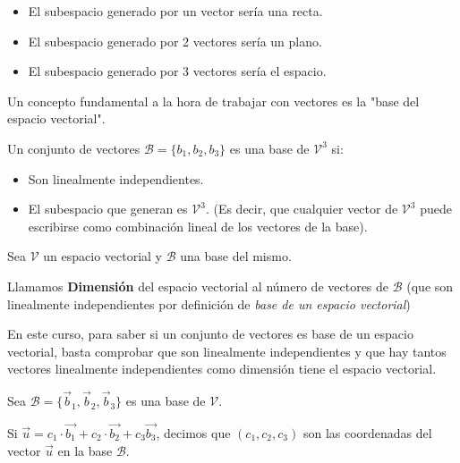 \begin{example}
\begin{itemize}
  \item El subespacio generado por un vector sería una recta.
  \item El subespacio generado por 2 vectores sería un plano.
  \item El subespacio generado por 3 vectores sería el espacio.
\end{itemize}
\end{example}

Un concepto fundamental a la hora de trabajar con vectores es la "base del espacio vectorial". 

\begin{defn}
Un conjunto de vectores $\mathcal{B} = \{b_1,b_2,b_3\}$ es una base de $\mathcal{V}^3$ si:
  \begin{itemize}
      \item Son linealmente independientes.
      \item El subespacio que generan es $\mathcal{V}^3$. (Es decir, que cualquier vector de $\mathcal{V}^3$ puede escribirse como combinación lineal de los vectores de la base).
  \end{itemize}
\end{defn}


\begin{defn}
Sea $\mathcal{V}$ un espacio vectorial y $\mathcal{B}$ una base del mismo.

Llamamos \textbf{Dimensión} del espacio vectorial al número de vectores de $\mathcal{B}$ (que son linealmente independientes por definición de \textit{base de un espacio vectorial})
\end{defn}

En este curso, para saber si un conjunto de vectores es base de un espacio vectorial, basta comprobar que son linealmente independientes y que hay tantos vectores linealmente independientes como dimensión tiene el espacio vectorial.


\begin{defn}
Sea $\mathcal{B} = \{\vec{b}_1,\vec{b}_2,\vec{b}_3\}$ es una base de $\mathcal{V}$.

Si $\vec{u} = c_1 · \vec{b_1} +  c_2·\vec{b_2} + c_3\vec{b_3}$, decimos que $(c_1,c_2,c_3)$ son las coordenadas del vector $\vec{u}$ en la base $\mathcal{B}$.
\end{defn}

